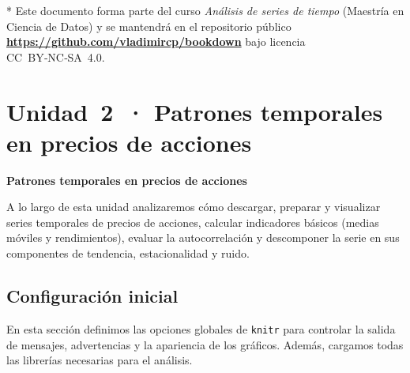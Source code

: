 \documentclass[
  11pt,
]{book}
\newenvironment{Shaded}{\begin{snugshade}}{\end{snugshade}}
\newcommand{\AttributeTok}[1]{\textcolor[rgb]{0.13,0.29,0.53}{#1}}
\newcommand{\CommentTok}[1]{\textcolor[rgb]{0.56,0.35,0.01}{\textit{#1}}}
\newcommand{\ConstantTok}[1]{\textcolor[rgb]{0.56,0.35,0.01}{#1}}
\newcommand{\DecValTok}[1]{\textcolor[rgb]{0.00,0.00,0.81}{#1}}
\newcommand{\FunctionTok}[1]{\textcolor[rgb]{0.13,0.29,0.53}{\textbf{#1}}}
\newcommand{\NormalTok}[1]{#1}
\newcommand{\SpecialCharTok}[1]{\textcolor[rgb]{0.81,0.36,0.00}{\textbf{#1}}}
\newcommand{\StringTok}[1]{\textcolor[rgb]{0.31,0.60,0.02}{#1}}
\begin{document}
* Este documento forma parte del curso \emph{Análisis de series de tiempo} (Maestría en Ciencia de Datos) y se mantendrá en el repositorio público \textbf{\url{https://github.com/vladimircp/bookdown}} bajo licencia CC~BY‑NC‑SA~4.0.

\chapter{Unidad~2~· Patrones temporales en precios de acciones}\label{unidad2}

\textbf{Patrones temporales en precios de acciones}

A lo largo de esta unidad analizaremos cómo descargar, preparar y visualizar series temporales de precios de acciones, calcular indicadores básicos (medias móviles y rendimientos), evaluar la autocorrelación y descomponer la serie en sus componentes de tendencia, estacionalidad y ruido.

\section{Configuración inicial}\label{configuraciuxf3n-inicial}

En esta sección definimos las opciones globales de \texttt{knitr} para controlar la salida de mensajes, advertencias y la apariencia de los gráficos. Además, cargamos todas las librerías necesarias para el análisis.

\begin{Shaded}
\end{Shaded}
\end{document}
